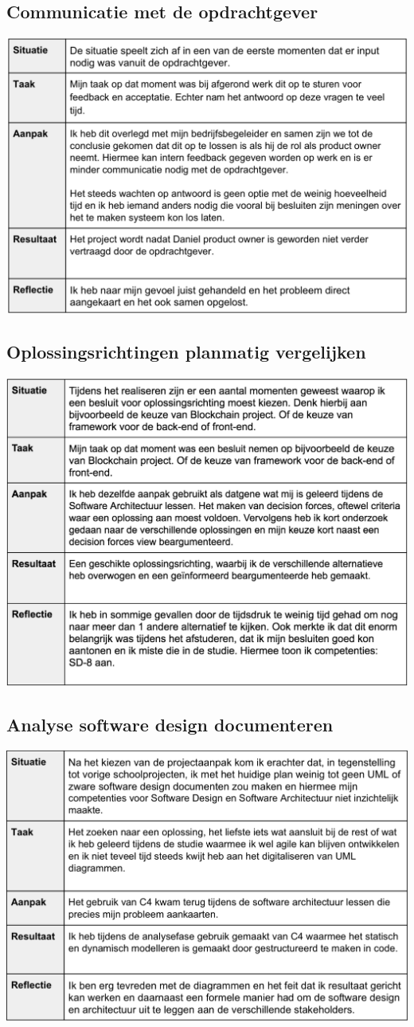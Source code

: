 \subsection{Communicatie met de opdrachtgever}
\includegraphics[width=\paperwidth-200]{images/sit_comm}

\subsection{Oplossingsrichtingen planmatig vergelijken}
\includegraphics[width=\paperwidth-200]{images/sit_oplossingrichting}

\subsection{Analyse software design documenteren}
\includegraphics[width=\paperwidth-200]{images/sit_modelana}